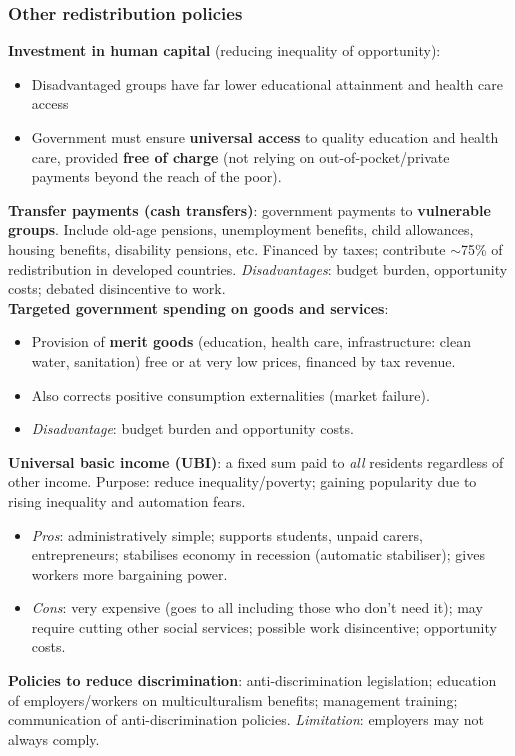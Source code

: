 \documentclass[a4paper,12pt]{article}
\begin{document}
\subsubsection*{Other redistribution policies}
\textbf{Investment in human capital} (reducing inequality of opportunity):
\begin{itemize}
  \item Disadvantaged groups have far lower educational attainment and health care access
  \item Government must ensure \textbf{universal access} to quality education and health care, provided \textbf{free of charge} (not relying on out-of-pocket/private payments beyond the reach of the poor).
\end{itemize}
\textbf{Transfer payments (cash transfers)}: government payments to \textbf{vulnerable groups}. Include old-age pensions, unemployment benefits, child allowances, housing benefits, disability pensions, etc. Financed by taxes; contribute $\sim$75\% of redistribution in developed countries. \textit{Disadvantages}: budget burden, opportunity costs; debated disincentive to work.
\\
\textbf{Targeted government spending on goods and services}:
\begin{itemize}
  \item Provision of \textbf{merit goods} (education, health care, infrastructure: clean water, sanitation) free or at very low prices, financed by tax revenue.
  \item Also corrects positive consumption externalities (market failure).
  \item \textit{Disadvantage}: budget burden and opportunity costs.
\end{itemize}
\textbf{Universal basic income (UBI)}: a fixed sum paid to \textit{all} residents regardless of other income. Purpose: reduce inequality/poverty; gaining popularity due to rising inequality and automation fears.
\begin{itemize}
  \item \textit{Pros}: administratively simple; supports students, unpaid carers, entrepreneurs; stabilises economy in recession (automatic stabiliser); gives workers more bargaining power.
  \item \textit{Cons}: very expensive (goes to all including those who don't need it); may require cutting other social services; possible work disincentive; opportunity costs.
\end{itemize}
\textbf{Policies to reduce discrimination}: anti-discrimination legislation; education of employers/workers on multiculturalism benefits; management training; communication of anti-discrimination policies. \textit{Limitation}: employers may not always comply.
\end{document}
